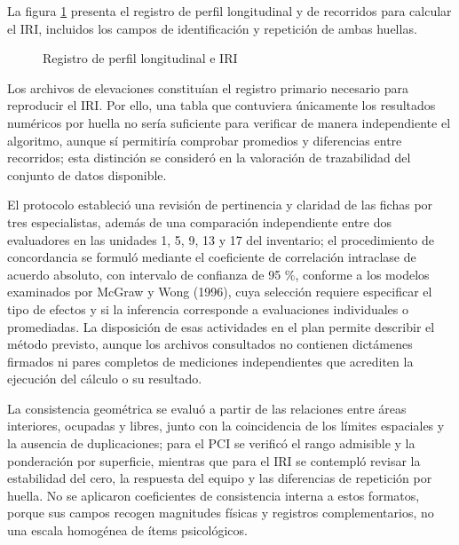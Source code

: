La figura \ref{fig:perfilado} presenta el registro de perfil longitudinal y de recorridos para calcular el IRI, incluidos los campos de identificación y repetición de ambas huellas.

\begin{figure}[p]
\centering
\caption{Registro de perfil longitudinal e IRI}
\label{fig:perfilado}
\begin{minipage}{0.95\linewidth}

\end{minipage}
\end{figure}

Los archivos de elevaciones constituían el registro primario necesario para reproducir el IRI. Por ello, una tabla que contuviera únicamente los resultados numéricos por huella no sería suficiente para verificar de manera independiente el algoritmo, aunque sí permitiría comprobar promedios y diferencias entre recorridos; esta distinción se consideró en la valoración de trazabilidad del conjunto de datos disponible.


El protocolo estableció una revisión de pertinencia y claridad de las fichas por tres especialistas, además de una comparación independiente entre dos evaluadores en las unidades 1, 5, 9, 13 y 17 del inventario; el procedimiento de concordancia se formuló mediante el coeficiente de correlación intraclase de acuerdo absoluto, con intervalo de confianza de 95 \%, conforme a los modelos examinados por McGraw y Wong (1996), cuya selección requiere especificar el tipo de efectos y si la inferencia corresponde a evaluaciones individuales o promediadas. La disposición de esas actividades en el plan permite describir el método previsto, aunque los archivos consultados no contienen dictámenes firmados ni pares completos de mediciones independientes que acrediten la ejecución del cálculo o su resultado.

La consistencia geométrica se evaluó a partir de las relaciones entre áreas interiores, ocupadas y libres, junto con la coincidencia de los límites espaciales y la ausencia de duplicaciones; para el PCI se verificó el rango admisible y la ponderación por superficie, mientras que para el IRI se contempló revisar la estabilidad del cero, la respuesta del equipo y las diferencias de repetición por huella. No se aplicaron coeficientes de consistencia interna a estos formatos, porque sus campos recogen magnitudes físicas y registros complementarios, no una escala homogénea de ítems psicológicos.


